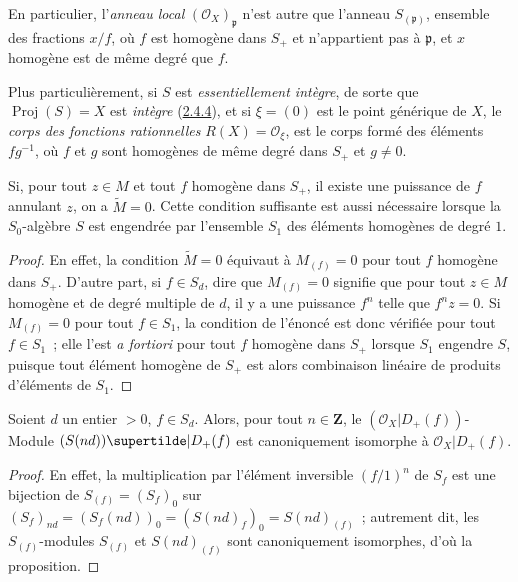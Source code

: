 En particulier, l'\emph{anneau local} $(\mathcal{O}_X)_\mathfrak{p}$ n'est
autre que l'anneau $S_{(\mathfrak{p})}$, ensemble des fractions $x/f$, où
$f$ est homogène dans $S_+$ et n'appartient pas à $\mathfrak{p}$, et $x$
homogène est de même degré que $f$.

Plus particulièrement, si $S$ est \emph{essentiellement intègre}, de sorte
que $\operatorname{Proj}(S)=X$ est \emph{intègre}
(\hyperref[II.2.4.4-fr]{2.4.4}), et si $\xi=(0)$ est le point générique de
$X$, le \emph{corps des fonctions rationnelles}
$R(X)=\mathcal{O}_\xi$, est le corps formé des éléments $fg^{-1}$, où $f$
et $g$ sont homogènes de même degré dans $S_+$ et $g\neq0$.

\begin{proposition}[2.5.6]
\label{II.2.5.6-fr}
Si, pour tout $z\in M$ et tout $f$ homogène dans $S_+$, il existe une
puissance de $f$ annulant $z$, on a $\widetilde{M}=0$. Cette condition
suffisante est aussi nécessaire lorsque la $S_0$-algèbre $S$ est engendrée
par l'ensemble $S_1$ des éléments homogènes de degré $1$.
\end{proposition}

\begin{proof}
En effet, la condition $\widetilde{M}=0$ équivaut à $M_{(f)}=0$ pour tout
$f$ homogène dans $S_+$. D'autre part, si $f\in S_d$, dire que $M_{(f)}=0$
signifie que pour tout $z\in M$ homogène et de degré multiple de $d$, il y
a une puissance $f^n$ telle que $f^nz=0$. Si $M_{(f)}=0$ pour tout
$f\in S_1$, la condition de l'énoncé est donc vérifiée pour tout
$f\in S_1$~; elle l'est \emph{a fortiori} pour tout $f$ homogène dans
$S_+$ lorsque $S_1$ engendre $S$, puisque tout élément homogène de $S_+$
est alors combinaison linéaire de produits d'éléments de $S_1$.
\end{proof}

\begin{proposition}[2.5.7]
\label{II.2.5.7-fr}
Soient $d$ un entier $>0$, $f\in S_d$. Alors, pour tout $n\in\mathbf{Z}$,
le $(\mathcal{O}_X|D_+(f))$-Module
$(S(nd))\supertilde|D_+(f)$ est canoniquement isomorphe à
$\mathcal{O}_X|D_+(f)$.
\end{proposition}

\begin{proof}
En effet, la multiplication par l'élément inversible $(f/1)^n$ de $S_f$
est une bijection de $S_{(f)}=(S_f)_0$ sur
$(S_f)_{nd}=(S_f(nd))_0=(S(nd)_f)_0=S(nd)_{(f)}$~; autrement dit, les
$S_{(f)}$-modules $S_{(f)}$ et $S(nd)_{(f)}$ sont canoniquement
isomorphes, d'où la proposition.
\end{proof}

